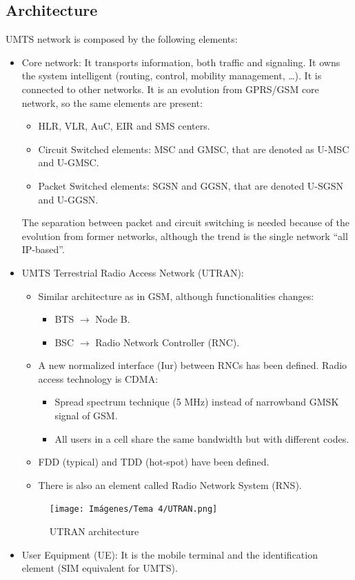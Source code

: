 \documentclass[
	12pt,
	twoside
]{book}
\begin{document}
\subsection{Architecture}

UMTS network is composed by the following elements:
\begin{itemize}
	\item {
		Core network: It transports information, both traffic and signaling. It owns the system intelligent (routing, control, mobility management, \ldots). It is connected to other networks. It is an evolution from GPRS/GSM core network, so the same elements are present:
		\begin{itemize}
			\item HLR, VLR, AuC, EIR and SMS centers.
			\item Circuit Switched elements: MSC and GMSC, that are denoted as U-MSC and U-GMSC.
			\item Packet Switched elements: SGSN and GGSN, that are denoted U-SGSN and U-GGSN.
		\end{itemize}
		The separation between packet and circuit switching is needed because of the evolution from former networks, although the trend is the single network ``all IP-based''.
	}
	\item {
		UMTS Terrestrial Radio Access Network (UTRAN):
		\begin{itemize}
			\item {
				Similar architecture as in GSM, although functionalities changes:
				\begin{itemize}
					\item BTS $\rightarrow$ Node B.
					\item BSC $\rightarrow$ Radio Network Controller (RNC).
				\end{itemize}
			}
			\item {
				A new normalized interface (Iur) between RNCs has been defined. Radio access technology is CDMA:
				\begin{itemize}
					\item Spread spectrum technique (5 MHz) instead of narrowband GMSK signal of GSM.
					\item All users in a cell share the same bandwidth but with different codes.
				\end{itemize}
			}
			\item FDD (typical) and TDD (hot-spot) have been defined.
			\item There is also an element called Radio Network System (RNS).
		\end{itemize}
		\begin{figure}[H]
			\centering
			\texttt{[image: Imágenes/Tema 4/UTRAN.png]}
			\caption{
				\label{fig:unit4_UTRAN_arch}
				UTRAN architecture
			}
		\end{figure}
	}
	\item User Equipment (UE): It is the mobile terminal and the identification element (SIM equivalent for UMTS).
\end{itemize}
\end{document}
